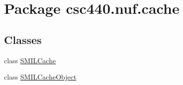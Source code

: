 \hypertarget{namespacecsc440_1_1nuf_1_1cache}{\section{Package csc440.\-nuf.\-cache}
\label{namespacecsc440_1_1nuf_1_1cache}
}
\subsection*{Classes}
\begin{DoxyCompactItemize}
\item 
class \hyperlink{classcsc440_1_1nuf_1_1cache_1_1_s_m_i_l_cache}{S\-M\-I\-L\-Cache}
\item 
class \hyperlink{classcsc440_1_1nuf_1_1cache_1_1_s_m_i_l_cache_object}{S\-M\-I\-L\-Cache\-Object}
\end{DoxyCompactItemize}
